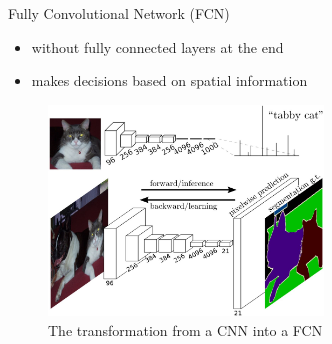 \documentclass{beamer}
\begin{document}
\begin{frame}[c]{Fully Convolutional Network (FCN)}
	\begin{itemize}
		\item without fully connected layers at the end
		\item makes decisions based on spatial information
	\end{itemize}
	
	\begin{figure}
		\includegraphics[width=0.65\textwidth]{intro/jlong.png}
		\caption{The transformation from a CNN into a FCN}
	\end{figure}
\end{frame}
\end{document}
